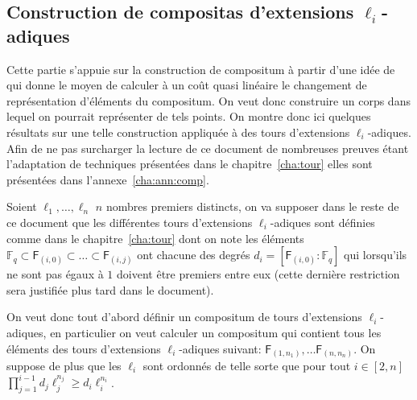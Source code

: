 \documentclass[10pt,a4paper]{book}
\theoremstyle{plain}
\theoremstyle{definition}
\theoremstyle{definition}
\theoremstyle{definition}
\theoremstyle{definition}
\theoremstyle{remark}
\theoremstyle{remark}
\theoremstyle{definition}
\begin{document}
\subsection{Construction de compositas d'extensions $\ell_i$-adiques}
\label{sub:con:com}

Cette partie s'appuie sur la construction de compositum à partir d'une idée de
\cite{DeFeoDoliskaniSchost14} qui donne le moyen de calculer à un coût quasi 
linéaire le changement de représentation d'éléments du compositum. On veut donc
construire un corps dans lequel on pourrait représenter de tels points. On 
montre donc ici quelques résultats sur une telle construction appliquée à des 
tours d'extensions $\ell_i$-adiques. Afin de ne pas surcharger la lecture de ce 
document de nombreuses preuves étant l'adaptation de techniques présentées 
dans le chapitre~\ref{cha:tour} elles sont présentées dans 
l'annexe~\ref{cha:ann:comp}.

Soient $\ell_1, \dots, \ell_n$ $n$ nombres premiers distincts, 
on va supposer dans le reste de ce document que les différentes tours 
d'extensions $\ell_i$-adiques sont définies comme dans le 
chapitre~\ref{cha:tour} dont on note les éléments 
$\mathbb{F}_q \subset \mathsf{F}_{(i,0)} \subset \dots \subset  \mathsf{F}_{(i,j)}$ 
ont chacune des degrés $d_i=[\mathsf{F}_{(i,0)}:\mathbb{F}_q]$ qui lorsqu'ils 
ne sont pas égaux à $1$ doivent être premiers entre eux (cette dernière 
restriction sera justifiée plus tard dans le document).

On veut donc tout d'abord définir un compositum de tours d'extensions 
$\ell_i$-adiques, en particulier on veut calculer un compositum qui contient 
tous les éléments des tours d'extensions $\ell_i$-adiques suivant:
$\mathsf{F}_{(1,n_1)}, \dots \mathsf{F}_{(n,n_n)}$. On suppose de plus que les
$\ell_i$ sont ordonnés de telle sorte que pour tout $i \in [2,n]$ 
$\prod_{j=1}^{i-1}d_j\ell_j^{n_j} \geqslant d_i\ell_i^{n_i}$.
\end{document}
